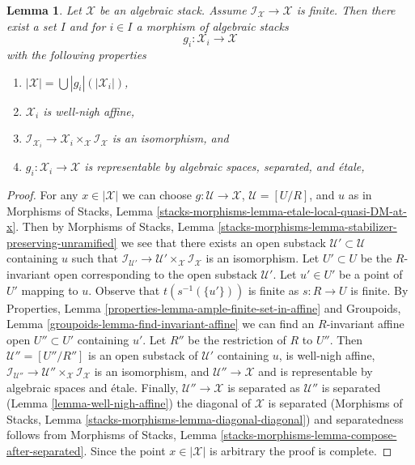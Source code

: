 \documentclass[10pt,a4paper]{amsart}
\theoremstyle{plain}
\newtheorem{lemma}[subsection]{Lemma}
\theoremstyle{definition}
\theoremstyle{remark}
\numberwithin{equation}{subsection}
\begin{document}
\begin{lemma}
\label{lemma-etale-local-finite-inertia}
Let $\mathcal{X}$ be an algebraic stack. Assume
$\mathcal{I}_\mathcal{X} \to \mathcal{X}$ is finite.
Then there exist a set $I$ and for $i \in I$ a morphism of algebraic stacks
$$
g_i : \mathcal{X}_i \longrightarrow \mathcal{X}
$$
with the following properties
\begin{enumerate}
\item $|\mathcal{X}| = \bigcup |g_i|(|\mathcal{X}_i|)$,
\item $\mathcal{X}_i$ is well-nigh affine,
\item $\mathcal{I}_{\mathcal{X}_i} \to
\mathcal{X}_i \times_\mathcal{X} \mathcal{I}_\mathcal{X}$
is an isomorphism, and
\item $g_i : \mathcal{X}_i \to \mathcal{X}$ is representable
by algebraic spaces, separated, and \'etale,
\end{enumerate}
\end{lemma}

\begin{proof}
For any $x \in |\mathcal{X}|$ we can choose
$g : \mathcal{U} \to \mathcal{X}$, $\mathcal{U} = [U/R]$, and $u$ as in
Morphisms of Stacks,
Lemma \ref{stacks-morphisms-lemma-etale-local-quasi-DM-at-x}.
Then by
Morphisms of Stacks, Lemma
\ref{stacks-morphisms-lemma-stabilizer-preserving-unramified}
we see that there exists an open substack
$\mathcal{U}' \subset \mathcal{U}$ containing $u$
such that $\mathcal{I}_{\mathcal{U}'} \to
\mathcal{U}' \times_\mathcal{X} \mathcal{I}_\mathcal{X}$
is an isomorphism.
Let $U' \subset U$ be the $R$-invariant open corresponding to
the open substack $\mathcal{U}'$.
Let $u' \in U'$ be a point of $U'$ mapping to $u$.
Observe that $t(s^{-1}(\{u'\}))$ is finite as $s : R \to U$ is finite.
By Properties, Lemma \ref{properties-lemma-ample-finite-set-in-affine}
and Groupoids, Lemma \ref{groupoids-lemma-find-invariant-affine}
we can find an $R$-invariant affine open $U'' \subset U'$
containing $u'$. Let $R''$ be the restriction of $R$ to $U''$.
Then $\mathcal{U}'' = [U''/R'']$ is an open substack of
$\mathcal{U}'$ containing $u$, is well-nigh affine,
$\mathcal{I}_{\mathcal{U}''} \to
\mathcal{U}'' \times_\mathcal{X} \mathcal{I}_\mathcal{X}$
is an isomorphism, and $\mathcal{U}'' \to \mathcal{X}$
and is representable by algebraic spaces and \'etale.
Finally, $\mathcal{U}'' \to \mathcal{X}$ is separated as
$\mathcal{U}''$ is separated (Lemma \ref{lemma-well-nigh-affine})
the diagonal of $\mathcal{X}$ is separated
(Morphisms of Stacks, Lemma \ref{stacks-morphisms-lemma-diagonal-diagonal})
and separatedness follows from Morphisms of Stacks, Lemma
\ref{stacks-morphisms-lemma-compose-after-separated}.
Since the point $x \in |\mathcal{X}|$ is arbitrary the proof is complete.
\end{proof}
\end{document}
